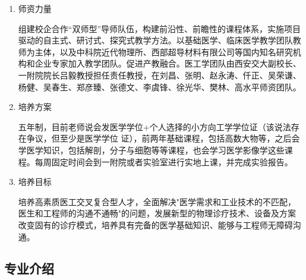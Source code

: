 \documentclass[zihao=-4,fontset=none]{Beautybook-CN}
\begin{document}
\begin{enumerate}
	\item 师资力量
	      	      	          
	      组建校企合作“双师型”导师队伍，构建前沿性、前瞻性的课程体系，实施项目驱动的自主式、研讨式、探究式教学方法。以基础医学、临床医学教学团队教师为主体，以及中科院近代物理所、西部超导材料有限公司等国内知名研究机构和企业专家加入教学团队。促进产教融合。医工学团队由西安交大副校长、一附院院长吕毅教授担任责任教授，在刘昌、张明、赵永涛、仟正、吴荣谦、杨健、吴春生、郑彦臻、张德文、李虞锋、徐光华、樊林、高水平师资团队。
	      	      	          
	\item 培养方案
	      	      	          
	      五年制，目前老师说会发医学学位+个人选择的小方向工学学位证（该说法存在争议，但至少是医学学位   证），前两年基础课程，包括高数大物等，之后会学医学知识，包括解剖，分子与细胞等等课程，也会学习医学影像学这些课程。每周固定时间会到一附院或者实验室进行实地上课，并完成实验报告。
	      	      
	      	      	          
	\item 培养目标
	      	      
	      培养高素质医工交叉复合型人才，全面解决"医学需求和工业技术的不匹配，医生和工程师的沟通不通畅"的问题，发展新型的物理诊疗技术、设备及方案 改变固有的诊疗模式，培养具有完备的医学基础知识、能够与工程师无障碍沟通。
\end{enumerate}

\subsection{专业介绍}
\end{document}
